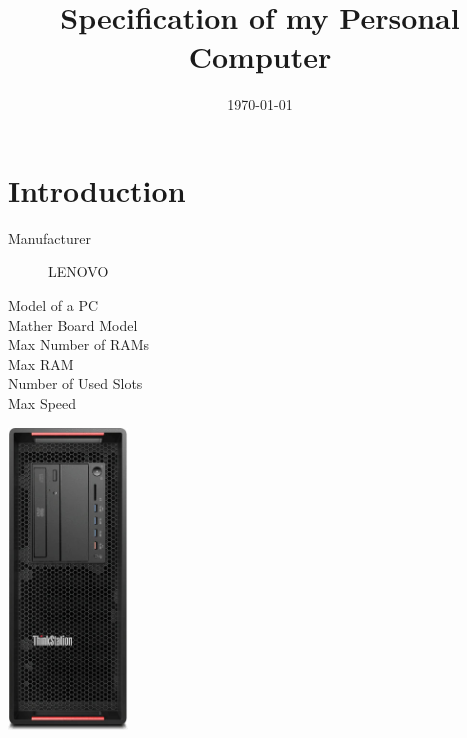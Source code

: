 \documentclass{article}
\title{Specification of my Personal Computer}
\author{}
\date{\today}
\begin{document}
\maketitle

\section{Introduction}
\begin{description}
 \item [Manufacturer]  LENOVO
 \item [Model of a PC] 
 \item [Mather Board Model] 
 \item [Max Number of RAMs] 
 \item [Max RAM] 
 \item [Number of Used Slots] 
 \item [Max Speed] 
\end{description}
\href{https://www.getech.co.uk/pdf/p5001.pdf}{\includegraphics[height=8cm]{PC.jpg}}
\end{document}
